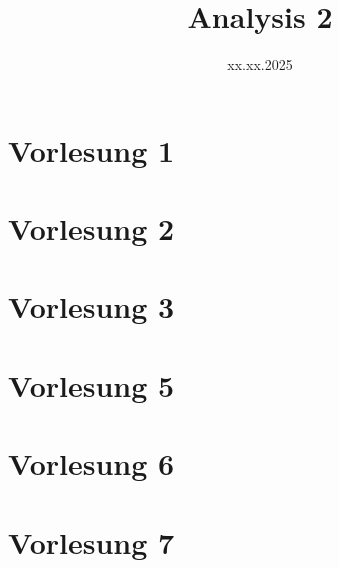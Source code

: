 \documentclass[]{scrbook}
\title{Analysis 2}
\author{}
\date{xx.xx.2025}
\begin{document}
\maketitle
\newpage
\tableofcontents
\newpage

\section*{Vorlesung 1} 


\section*{Vorlesung 2}


\section*{Vorlesung 3}


\section*{Vorlesung 5}


\section*{Vorlesung 6}


\section*{Vorlesung 7}

\end{document}

